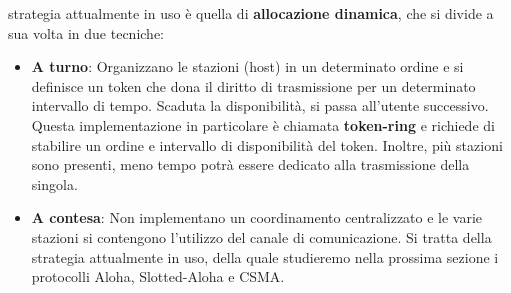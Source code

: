strategia attualmente in uso è quella di \textbf{allocazione dinamica}, che si divide a sua volta in due tecniche: \begin{itemize}
    \item \textbf{A turno}: Organizzano le stazioni (host) in un determinato ordine e si definisce un token che dona il diritto di trasmissione per un
    determinato intervallo di tempo. Scaduta la disponibilità, si passa all'utente successivo. Questa implementazione in particolare è chiamata
    \textbf{token-ring} e richiede di stabilire un ordine e intervallo di disponibilità del token. Inoltre, più stazioni sono presenti, meno tempo
    potrà essere dedicato alla trasmissione della singola.
    \item \textbf{A contesa}: Non implementano un coordinamento centralizzato e le varie stazioni si contengono l'utilizzo del canale di comunicazione.
    Si tratta della strategia attualmente in uso, della quale studieremo nella prossima sezione i protocolli Aloha, Slotted-Aloha e CSMA.
\end{itemize}

%

